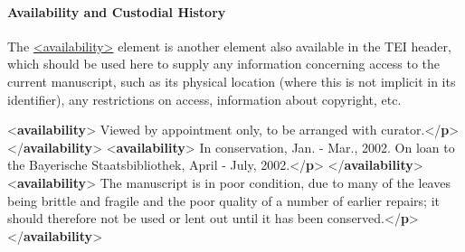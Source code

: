 \paragraph[{Availability and Custodial History}]{Availability and Custodial History}\label{msadch}\par
The \hyperref[TEI.availability]{<availability>} element is another element also available in the TEI header, which should be used here to supply any information concerning access to the current manuscript, such as its physical location (where this is not implicit in its identifier), any restrictions on access, information about copyright, etc. \par\bgroup{}\exampleFont \begin{shaded}\noindent\mbox{}{<\textbf{availability}>}\mbox{}\newline 
{}Viewed by appointment only, to be arranged with curator.{</\textbf{p}>}\mbox{}\newline 
{</\textbf{availability}>}\mbox{}\newline 
{<\textbf{availability}>}\mbox{}\newline 
{}In conservation, Jan. - Mar., 2002. On loan to the Bayerische\mbox{}\newline 
\hspace*{1em}\hspace*{1em} Staatsbibliothek, April - July, 2002.{</\textbf{p}>}\mbox{}\newline 
{</\textbf{availability}>}\mbox{}\newline 
{<\textbf{availability}>}\mbox{}\newline 
{}The manuscript is in poor condition, due to many of the leaves being brittle\mbox{}\newline 
\hspace*{1em}\hspace*{1em} and fragile and the poor quality of a number of earlier repairs; it should\mbox{}\newline 
\hspace*{1em}\hspace*{1em} therefore not be used or lent out until it has been conserved.{</\textbf{p}>}\mbox{}\newline 
{</\textbf{availability}>}\end{shaded}\egroup\par \par
